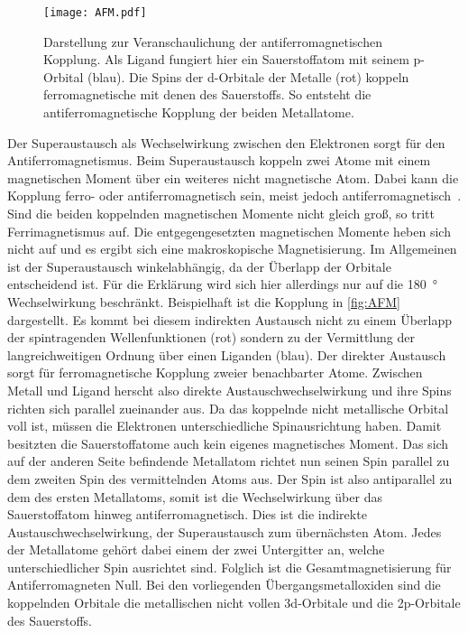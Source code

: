         \begin{figure}
            \centering
            \texttt{[image: AFM.pdf]}
            \caption{Darstellung zur Veranschaulichung der antiferromagnetischen Kopplung.
            Als Ligand fungiert hier ein Sauerstoffatom mit seinem p-Orbital (blau).
            Die Spins der d-Orbitale der Metalle (rot) koppeln ferromagnetische mit denen des Sauerstoffs.
            So entsteht die antiferromagnetische Kopplung der beiden Metallatome.}
            \label{fig:AFM}
        \end{figure}
        Der Superaustausch als Wechselwirkung zwischen den Elektronen sorgt für den Antiferromagnetismus.
        Beim Superaustausch koppeln zwei Atome mit einem magnetischen Moment über ein weiteres nicht magnetische Atom. 
        Dabei kann die Kopplung ferro- oder antiferromagnetisch sein, meist jedoch antiferromagnetisch~\cite{AFM_1}.
        Sind die beiden koppelnden magnetischen Momente nicht gleich groß, so tritt Ferrimagnetismus auf.
        Die entgegengesetzten magnetischen Momente heben sich nicht auf und es ergibt sich eine makroskopische Magnetisierung.
        Im Allgemeinen ist der Superaustausch winkelabhängig, da der Überlapp der Orbitale entscheidend ist.
        Für die Erklärung wird sich hier allerdings nur auf die \SI{180}{\degree} Wechselwirkung beschränkt.
        Beispielhaft ist die Kopplung in \autoref{fig:AFM} dargestellt.
        Es kommt bei diesem indirekten Austausch nicht zu einem Überlapp der spintragenden Wellenfunktionen (rot) sondern zu der Vermittlung der langreichweitigen Ordnung über einen Liganden (blau).
        Der direkter Austausch sorgt für ferromagnetische Kopplung zweier benachbarter Atome.
        Zwischen Metall und Ligand herscht also direkte Austauschwechselwirkung und ihre Spins richten sich parallel zueinander aus.
        Da das koppelnde nicht metallische Orbital voll ist, müssen die Elektronen unterschiedliche Spinausrichtung haben.
        Damit besitzten die Sauerstoffatome auch kein eigenes magnetisches Moment.
        Das sich auf der anderen Seite befindende Metallatom richtet nun seinen Spin parallel zu dem zweiten Spin des vermittelnden Atoms aus.
        Der Spin ist also antiparallel zu dem des ersten Metallatoms, somit ist die Wechselwirkung über das Sauerstoffatom hinweg antiferromagnetisch. 
        Dies ist die indirekte Austauschwechselwirkung, der Superaustausch zum übernächsten Atom.
        Jedes der Metallatome gehört dabei einem der zwei Untergitter an, welche unterschiedlicher Spin ausrichtet sind.
        Folglich ist die Gesamtmagnetisierung für Antiferromagneten Null.
        Bei den vorliegenden Übergangsmetalloxiden sind die koppelnden Orbitale die metallischen nicht vollen 3d-Orbitale und die 2p-Orbitale des Sauerstoffs.
        
